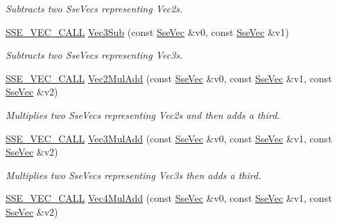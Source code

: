 \begin{DoxyCompactItemize}
\begin{DoxyCompactList}\small\item\em Subtracts two Sse\+Vecs representing Vec2s. \end{DoxyCompactList}\item 
\hyperlink{ssevec__math__defs_8h_a97454f977a5281455cecacce1e8ba670}{S\+S\+E\+\_\+\+V\+E\+C\+\_\+\+C\+A\+L\+L} \hyperlink{group___s_i_m_d_vec_math_gad3a936a686c5d67ed357c9f5b8fc3935}{Vec3\+Sub} (const \hyperlink{namespacegofxmath_a634570ddcd2496053ee966227080e02f}{Sse\+Vec} \&v0, const \hyperlink{namespacegofxmath_a634570ddcd2496053ee966227080e02f}{Sse\+Vec} \&v1)
\begin{DoxyCompactList}\small\item\em Subtracts two Sse\+Vecs representing Vec3s. \end{DoxyCompactList}\item 
\hyperlink{ssevec__math__defs_8h_a97454f977a5281455cecacce1e8ba670}{S\+S\+E\+\_\+\+V\+E\+C\+\_\+\+C\+A\+L\+L} \hyperlink{group___s_i_m_d_vec_math_gac636b80fed0de6de23d967e2c3843c5c}{Vec2\+Mul\+Add} (const \hyperlink{namespacegofxmath_a634570ddcd2496053ee966227080e02f}{Sse\+Vec} \&v0, const \hyperlink{namespacegofxmath_a634570ddcd2496053ee966227080e02f}{Sse\+Vec} \&v1, const \hyperlink{namespacegofxmath_a634570ddcd2496053ee966227080e02f}{Sse\+Vec} \&v2)
\begin{DoxyCompactList}\small\item\em Multiplies two Sse\+Vecs representing Vec2s and then adds a third. \end{DoxyCompactList}\item 
\hyperlink{ssevec__math__defs_8h_a97454f977a5281455cecacce1e8ba670}{S\+S\+E\+\_\+\+V\+E\+C\+\_\+\+C\+A\+L\+L} \hyperlink{group___s_i_m_d_vec_math_ga8bf86ce62253caf59a6312559c203272}{Vec3\+Mul\+Add} (const \hyperlink{namespacegofxmath_a634570ddcd2496053ee966227080e02f}{Sse\+Vec} \&v0, const \hyperlink{namespacegofxmath_a634570ddcd2496053ee966227080e02f}{Sse\+Vec} \&v1, const \hyperlink{namespacegofxmath_a634570ddcd2496053ee966227080e02f}{Sse\+Vec} \&v2)
\begin{DoxyCompactList}\small\item\em Multiplies two Sse\+Vecs representing Vec3s then adds a third. \end{DoxyCompactList}\item 
\hyperlink{ssevec__math__defs_8h_a97454f977a5281455cecacce1e8ba670}{S\+S\+E\+\_\+\+V\+E\+C\+\_\+\+C\+A\+L\+L} \hyperlink{group___s_i_m_d_vec_math_gadd6b823e88b387ad8deaa65244ad46a0}{Vec4\+Mul\+Add} (const \hyperlink{namespacegofxmath_a634570ddcd2496053ee966227080e02f}{Sse\+Vec} \&v0, const \hyperlink{namespacegofxmath_a634570ddcd2496053ee966227080e02f}{Sse\+Vec} \&v1, const \hyperlink{namespacegofxmath_a634570ddcd2496053ee966227080e02f}{Sse\+Vec} \&v2)

\end{DoxyCompactItemize}
